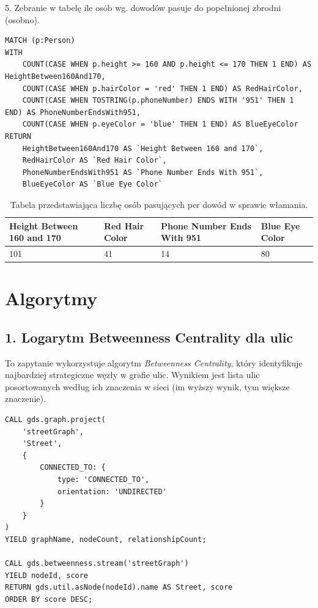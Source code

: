 \documentclass[a4paper,12pt]{article}
\begin{document}
5. Zebranie w tabelę ile osób wg. dowodów pasuje do popełnionej zbrodni (osobno).

\begin{center}
\begin{minipage}{0.8\linewidth}
\begin{lstlisting}[language=Cypher, basicstyle=\small, breaklines=true]
MATCH (p:Person)
WITH
    COUNT(CASE WHEN p.height >= 160 AND p.height <= 170 THEN 1 END) AS HeightBetween160And170,
    COUNT(CASE WHEN p.hairColor = 'red' THEN 1 END) AS RedHairColor,
    COUNT(CASE WHEN TOSTRING(p.phoneNumber) ENDS WITH '951' THEN 1 END) AS PhoneNumberEndsWith951,
    COUNT(CASE WHEN p.eyeColor = 'blue' THEN 1 END) AS BlueEyeColor
RETURN 
    HeightBetween160And170 AS `Height Between 160 and 170`, 
    RedHairColor AS `Red Hair Color`, 
    PhoneNumberEndsWith951 AS `Phone Number Ends With 951`,
    BlueEyeColor AS `Blue Eye Color`
\end{lstlisting}
\end{minipage}
\end{center}

\begin{table}[h!]
\centering
\begin{tabular}{|p{4cm}|p{4cm}|p{4cm}|p{4cm}|}
\hline
\textbf{Height Between 160 and 170} & \textbf{Red Hair Color} & \textbf{Phone Number Ends With 951} & \textbf{Blue Eye Color} \\
\hline
101 & 41 & 14 & 80 \\
\hline
\end{tabular}
\caption{Tabela przedstawiająca liczbę osób pasujących per dowód w sprawie włamania.}
\label{tab:criteria_counts}
\end{table}

\newpage

\section{Algorytmy}

\subsection*{1. Logarytm Betweenness Centrality dla ulic}
To zapytanie wykorzystuje algorytm \textit{Betweenness Centrality}, który identyfikuje najbardziej strategiczne węzły w grafie ulic. Wynikiem jest lista ulic posortowanych według ich znaczenia w sieci (im wyższy wynik, tym większe znaczenie).
\begin{verbatim}
CALL gds.graph.project(
    'streetGraph',
    'Street',
    {
        CONNECTED_TO: {
            type: 'CONNECTED_TO',
            orientation: 'UNDIRECTED'
        }
    }
)
YIELD graphName, nodeCount, relationshipCount;

CALL gds.betweenness.stream('streetGraph') 
YIELD nodeId, score
RETURN gds.util.asNode(nodeId).name AS Street, score
ORDER BY score DESC;
\end{verbatim}
\end{document}
